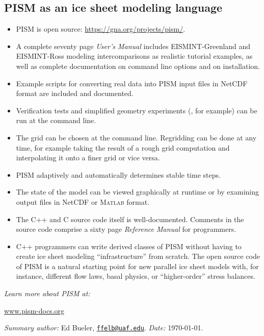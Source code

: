 \documentclass[12pt,final]{amsart}
\newcommand{\Matlab}{\textsc{Matlab}\xspace}
\begin{document}
\subsection*{PISM as an ice sheet modeling language}  \begin{itemize}
\item PISM is open source: \url{https://gna.org/projects/pism/}.
\item A complete seventy page \emph{User's Manual} includes EISMINT-Greenland \citep{RitzEISMINT} and EISMINT-Ross \citep{MacAyealetal} modeling intercomparisons as realistic tutorial examples, as well as complete documentation on command line options and on installation.
\item Example scripts for converting real data into PISM input files in NetCDF format are included and documented.
\item Verification tests and simplified geometry experiments (\citep{EISMINT00}, for example) can be run at the command line.
\item The grid can be chosen at the command line.  Regridding can be done at any time, for example taking the result of a rough grid computation and interpolating it onto a finer grid or vice versa.
\item PISM adaptively and automatically determines stable time steps.
\item The state of the model can be viewed graphically at runtime or by examining output files in NetCDF or \Matlab format.
\item The C++ and C source code itself is well-documented.  Comments in the source code comprise a sixty page \emph{Reference Manual} for programmers.  
\item C++ programmers can write derived classes of PISM without having to create ice sheet modeling ``infrastructure'' from scratch.  The open source code of PISM is a natural starting point for new parallel ice sheet models with, for instance, different flow laws, basal physics, or ``higher-order'' stress balances.
\end{itemize}

\small


\normalsize

\vfill
\noindent\emph{Learn more about PISM at:}
\bigskip

\centerline{\href{http://www.pism-docs.org/}{www.pism-docs.org}}
\vfill
\scriptsize
\noindent \emph{Summary author:} Ed Bueler, \href{mailto:ffelb@uaf.edu}{\texttt{ffelb@uaf.edu}}.  \hfill \emph{Date:} \today.
\end{document}
